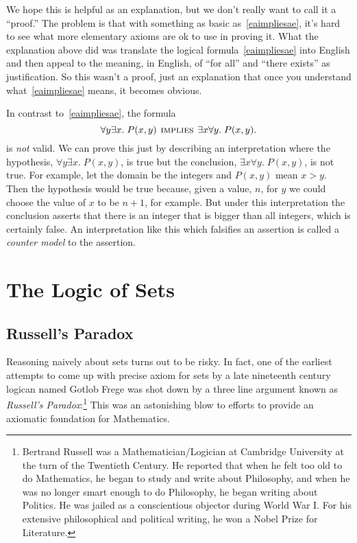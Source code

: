 We hope this is helpful as an explanation, but we don't really want to
call it a ``proof.''  The problem is that with something as basic
as~\eqref{eaimpliesae}, it's hard to see what more elementary axioms are
ok to use in proving it.  What the explanation above did was translate the
logical formula~\eqref{eaimpliesae} into English and then appeal to the
meaning, in English, of ``for all'' and ``there exists'' as justification.
So this wasn't a proof, just an explanation that once you understand
what~\eqref{eaimpliesae} means, it becomes obvious.

In contrast to~\eqref{eaimpliesae}, the formula
\begin{equation}\label{aenotimplyea}
\forall y \exists x.\; P(x,y) \mathbin{\mathrm{\textsc{\,implies\,}}} \exists x \forall y.\; P(x,y).
\end{equation}
is \emph{not} valid.  We can prove this just by describing an
interpretation where the hypothesis, $\forall y \exists x.\; P(x,y)$, is
true but the conclusion, $\exists x \forall y.\; P(x,y)$, is not true.
For example, let the domain be the integers and $P(x,y)$ mean $x > y$.
Then the hypothesis would be true because, given a value, $n$, for $y$ we
could choose the value of $x$ to be $n+1$, for example.  But under this
interpretation the conclusion asserts that there is an integer that is
bigger than all integers, which is certainly false.  An interpretation
like this which falsifies an assertion is called a \emph{counter model} to
the assertion.

\begin{problems}
\classproblems
{}
\homeworkproblems
{}
\end{problems}

\section{The Logic of Sets}

\subsection{Russell's Paradox}

Reasoning naively about sets turns out to be risky.  In fact, one of the
earliest attempts to come up with precise axiom for sets by a late
nineteenth century logican named Gotlob Frege was shot down by a three
line argument known as \emph{Russell's Paradox}:\footnote{Bertrand Russell
  was a Mathematician/Logician at Cambridge University at the turn of the
  Twentieth Century.  He reported that when he felt too old to do
  Mathematics, he began to study and write about Philosophy, and when he
  was no longer smart enough to do Philosophy, he began writing about
  Politics.  He was jailed as a conscientious objector during World War I.
  For his extensive philosophical and political writing, he won a Nobel
  Prize for Literature.}  This was an astonishing blow to efforts to
provide an axiomatic foundation for Mathematics.

